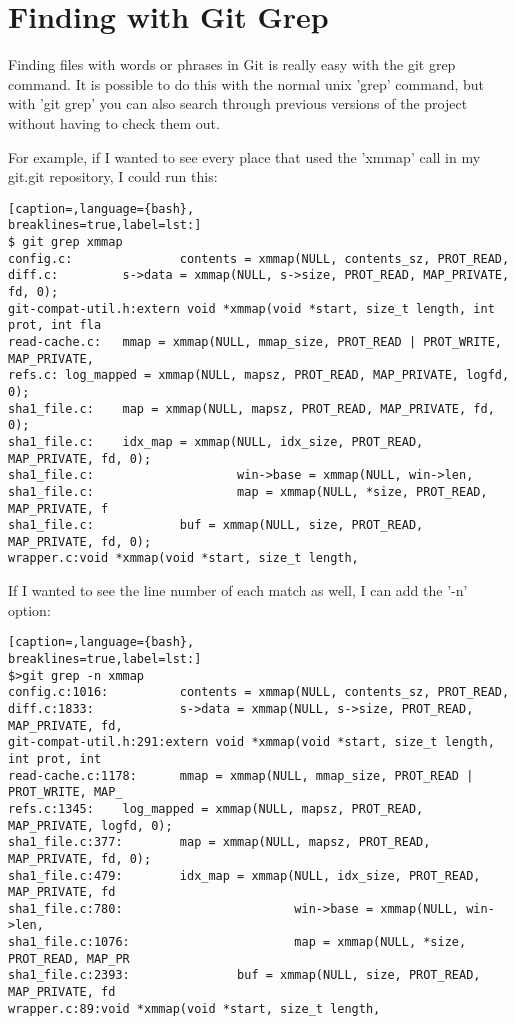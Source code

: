 \section{Finding with Git Grep}
Finding files with words or phrases in Git is really easy with the git grep
command. It is possible to do this with the normal unix 'grep' command, but
with 'git grep' you can also search through previous versions of the project
without having to check them out.

For example, if I wanted to see every place that used the 'xmmap' call in my
git.git repository, I could run this:
\lstset{basicstyle=\scriptsize, numbers=none, captionpos=b, tabsize=4}
\begin{lstlisting}[caption=,language={bash},
breaklines=true,label=lst:]
$ git grep xmmap
config.c:               contents = xmmap(NULL, contents_sz, PROT_READ,
diff.c:         s->data = xmmap(NULL, s->size, PROT_READ, MAP_PRIVATE, fd, 0);
git-compat-util.h:extern void *xmmap(void *start, size_t length, int prot, int fla
read-cache.c:   mmap = xmmap(NULL, mmap_size, PROT_READ | PROT_WRITE, MAP_PRIVATE,
refs.c: log_mapped = xmmap(NULL, mapsz, PROT_READ, MAP_PRIVATE, logfd, 0);
sha1_file.c:    map = xmmap(NULL, mapsz, PROT_READ, MAP_PRIVATE, fd, 0);
sha1_file.c:    idx_map = xmmap(NULL, idx_size, PROT_READ, MAP_PRIVATE, fd, 0);
sha1_file.c:                    win->base = xmmap(NULL, win->len,
sha1_file.c:                    map = xmmap(NULL, *size, PROT_READ, MAP_PRIVATE, f
sha1_file.c:            buf = xmmap(NULL, size, PROT_READ, MAP_PRIVATE, fd, 0);
wrapper.c:void *xmmap(void *start, size_t length,
\end{lstlisting}

If I wanted to see the line number of each match as well, I can add the '-n'
option:
\lstset{basicstyle=\scriptsize, numbers=none, captionpos=b, tabsize=4}
\begin{lstlisting}[caption=,language={bash},
breaklines=true,label=lst:]
$>git grep -n xmmap
config.c:1016:          contents = xmmap(NULL, contents_sz, PROT_READ,
diff.c:1833:            s->data = xmmap(NULL, s->size, PROT_READ, MAP_PRIVATE, fd,
git-compat-util.h:291:extern void *xmmap(void *start, size_t length, int prot, int
read-cache.c:1178:      mmap = xmmap(NULL, mmap_size, PROT_READ | PROT_WRITE, MAP_
refs.c:1345:    log_mapped = xmmap(NULL, mapsz, PROT_READ, MAP_PRIVATE, logfd, 0);
sha1_file.c:377:        map = xmmap(NULL, mapsz, PROT_READ, MAP_PRIVATE, fd, 0);
sha1_file.c:479:        idx_map = xmmap(NULL, idx_size, PROT_READ, MAP_PRIVATE, fd
sha1_file.c:780:                        win->base = xmmap(NULL, win->len,
sha1_file.c:1076:                       map = xmmap(NULL, *size, PROT_READ, MAP_PR
sha1_file.c:2393:               buf = xmmap(NULL, size, PROT_READ, MAP_PRIVATE, fd
wrapper.c:89:void *xmmap(void *start, size_t length,
\end{lstlisting}

